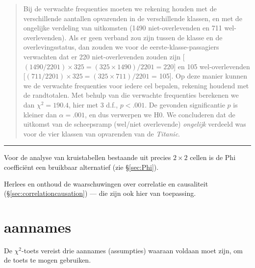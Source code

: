 \documentclass[
]{book}
\begin{document}
\begin{quote}
Bij de verwachte frequenties moeten we rekening houden met de
verschillende aantallen opvarenden in de verschillende klassen, en met
de ongelijke verdeling van uitkomsten (1490 niet-overlevenden en 711
wel-overlevenden). Als er geen verband zou zijn tussen de klasse en de
overlevingsstatus, dan zouden we voor de eerste-klasse-passagiers
verwachten dat er 220 niet-overlevenden zouden zijn
{[}\((1490/2201) \times 325 = (325 \times 1490) / 2201 = 220\){]} en 105
wel-overlevenden {[}\((711/2201) \times 325 = (325 \times 711) / 2201\) =
105{]}. Op deze manier kunnen we de verwachte frequenties voor iedere cel
bepalen, rekening houdend met de randtotalen. Met behulp van die
verwachte frequenties berekenen we dan \(\chi^2=190.4\), hier met 3 d.f.,
\(p<.001\). De gevonden significantie \(p\) is kleiner dan \(\alpha=.001\), en
dus verwerpen we H0. We concluderen dat de uitkomst van de scheepsramp
(wel/niet overlevende) \emph{ongelijk} verdeeld was voor de vier klassen van
opvarenden van de \emph{Titanic}.
\end{quote}

\begin{center}\rule{0.5\linewidth}{0.5pt}\end{center}

Voor de analyse van kruistabellen bestaande uit precies \(2\times2\)
cellen is de Phi coefficiënt een bruikbaar alternatief (zie
§\ref{sec:Phi}).

Herlees en onthoud de waarschuwingen over correlatie en causaliteit (§\ref{sec:correlationcausation})
--- die zijn ook hier van toepassing.

\hypertarget{sec:chi2toets-aannames}{%
\section{aannames}\label{sec:chi2toets-aannames}}

De \(\chi^2\)-toets vereist drie aannames (assumpties) waaraan voldaan moet zijn, om de
toets te mogen gebruiken.
\end{document}
